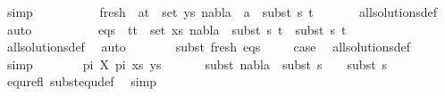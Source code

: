 \begin{isabellebody}
\ simp\isanewline
\isanewline
\ \ \ \isamarkupfalse%
\ {}\isanewline
\ \ \ \isamarkupfalse%
\ fresh{\isacharcolon}{\kern0pt}\ {\isachardoublequoteopen}{\isasymforall}\ {\isacharparenleft}{\kern0pt}a{\isacharcomma}{\kern0pt}t{\isacharparenright}{\kern0pt}\ {\isasymin}\ set\ ys{\isachardot}{\kern0pt}\ nabla{}\ {\isasymturnstile}\ a\ {\isasymsharp}\ subst\ s{}\ t{\isachardoublequoteclose}\isanewline
\ \ \ \ \ \isamarkupfalse%
\ all{\isacharunderscore}{\kern0pt}solutions{\isacharunderscore}{\kern0pt}def\ \isamarkupfalse%
\ auto\isanewline
\isanewline
\ \ \ \isamarkupfalse%
\ {}\isanewline
\ \ \ \isamarkupfalse%
\ eqs{\isacharcolon}{\kern0pt}\ {\isachardoublequoteopen}{\isasymforall}\ {\isacharparenleft}{\kern0pt}t{}{\isacharcomma}{\kern0pt}t{}{\isacharparenright}{\kern0pt}\ {\isasymin}\ set\ xs{\isachardot}{\kern0pt}\ nabla{}\ {\isasymturnstile}\ subst\ s{}\ t{}\ {\isasymapprox}\ subst\ s{}\ t{}{\isachardoublequoteclose}\isanewline
\ \ \ \ \ \isamarkupfalse%
\ all{\isacharunderscore}{\kern0pt}solutions{\isacharunderscore}{\kern0pt}def\ \isamarkupfalse%
\ auto\isanewline
\ \ \isanewline
\ \ \ \isamarkupfalse%
\ subst\ fresh\ eqs\isanewline
\ \ \ \isamarkupfalse%
\ {\isacharquery}{\kern0pt}case\ \isamarkupfalse%
\ all{\isacharunderscore}{\kern0pt}solutions{\isacharunderscore}{\kern0pt}def\ \isamarkupfalse%
\ simp\isanewline
\ \isamarkupfalse%
\isanewline
\ \ \ \isamarkupfalse%
\ {\isacharparenleft}{\kern0pt}{}\ pi{}\ X\ pi{}\ xs\ ys{\isacharparenright}{\kern0pt}\isanewline
\ \ \ \isamarkupfalse%
\ \isamarkupfalse%
\ subst{\isacharcolon}{\kern0pt}\ {\isachardoublequoteopen}nabla{}\ {\isasymTurnstile}\ subst\ {\isacharparenleft}{\kern0pt}s{}\ {\isasymbullet}\ {\isacharbrackleft}{\kern0pt}{\isacharbrackright}{\kern0pt}{\isacharparenright}{\kern0pt}\ {\isasymapprox}\ subst\ s{}{\isachardoublequoteclose}\ \isanewline
\ \ \ \ \ \isamarkupfalse%
\ equ{\isacharunderscore}{\kern0pt}refl\ subst{\isacharunderscore}{\kern0pt}equ{\isacharunderscore}{\kern0pt}def\ \isamarkupfalse%
\ simp\isanewline
\isanewline
\ \ \ \isamarkupfalse%

\end{isabellebody}
